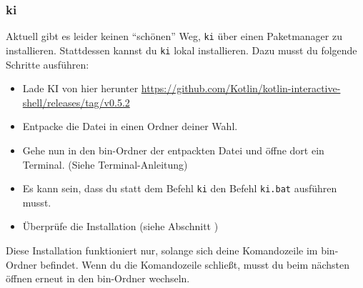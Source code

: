 \subsubsection{ki}
Aktuell gibt es leider keinen \enquote{schönen} Weg, \texttt{ki} über einen Paketmanager zu installieren. Stattdessen kannst du \texttt{ki} lokal installieren. Dazu musst du folgende Schritte ausführen:
\begin{itemize}
    \item Lade KI von hier herunter \url{https://github.com/Kotlin/kotlin-interactive-shell/releases/tag/v0.5.2}
    \item Entpacke die Datei in einen Ordner deiner Wahl.
    \item Gehe nun in den bin-Ordner der entpackten Datei und öffne dort ein Terminal. (Siehe Terminal-Anleitung)
    \item Es kann sein, dass du statt dem Befehl \texttt{ki} den Befehl \texttt{ki.bat} ausführen musst.
    \item Überprüfe die Installation (siehe Abschnitt )
\end{itemize}
\begin{hinweis}
    Diese Installation funktioniert nur, solange sich deine Komandozeile im bin-Ordner befindet. Wenn du die Komandozeile schließt, musst du beim nächsten öffnen erneut in den bin-Ordner wechseln.
\end{hinweis}


